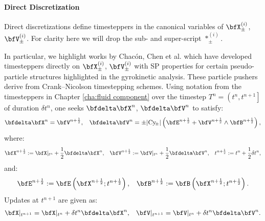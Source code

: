 \paragraph*{Direct Discretization}
    Direct discretizations define timesteppers in the canonical variables of $\bfX_{\pm}^{(i)}$, $\bfV_{\pm}^{(i)}$. For clarity here we will drop the sub- and super-script $*_{\pm}^{(i)}$.

    \shortline

    In particular, we highlight works by Chacón, Chen et al. \cite{Chen_Chacón_Barnes_2011, Chacón_Chen_Barnes_2013, Chen_Chacón_2014, Chen_Chacón_2015} which
     have developed timesteppers directly on $\bfX_{\pm}^{(i)}$, $\bfV_{\pm}^{(i)}$ with SP properties for certain pseudo-particle structures highlighted in the gyrokinetic analysis. These particle pushers derive from Crank--Nicolson timestepping schemes. Using notation from the timesteppers in Chapter \ref{cha:fluid component} over the timestep $T^{n} = \left(t^{n}, t^{n + 1}\right]$ of duration $\delta t^{n}$, one seeks $\bfdelta\bfX^{n}$, $\bfdelta\bfV^{n}$ to satisfy:
    \begin{align}
        \bfdelta\bfX^{n}
            =  \bfV^{n + \frac{1}{2}},  &&
        \bfdelta\bfV^{n}
            =  \pm |\rmCy\!_{\pm}|\left(\bfE^{n + \frac{1}{2}} + \bfV^{n + \frac{1}{2}}\wedge\bfB^{n + \frac{1}{2}}\right),
    \end{align}
    where:
    \begin{align}
        \bfX^{n + \frac{1}{2}}  :=  \bfX|_{t^{n}} + \frac{1}{2}\bfdelta\bfX^{n},  &&
        \bfV^{n + \frac{1}{2}}  :=  \bfV|_{t^{n}} + \frac{1}{2}\bfdelta\bfV^{n},  &&
        t^{n + \frac{1}{2}}  :=  t^{n} + \frac{1}{2}\delta t^{n},
    \end{align}
    and:
    \begin{align}
        \bfE^{n + \frac{1}{2}}  :=  \bfE\left(\bfX^{n + \frac{1}{2}}; t^{n + \frac{1}{2}}\right),  &&
        \bfB^{n + \frac{1}{2}}  :=  \bfB\left(\bfX^{n + \frac{1}{2}}; t^{n + \frac{1}{2}}\right).
    \end{align}
    Updates at $t^{n + 1}$ are given as:
    \begin{align}
        \bfX|_{t^{n + 1}}  =  \bfX|_{t^{n}} + \delta t^{n}\bfdelta\bfX^{n},  &&
        \bfV|_{t^{n + 1}}  =  \bfV|_{t^{n}} + \delta t^{n}\bfdelta\bfV^{n}.
    \end{align}
    
    \shortline

